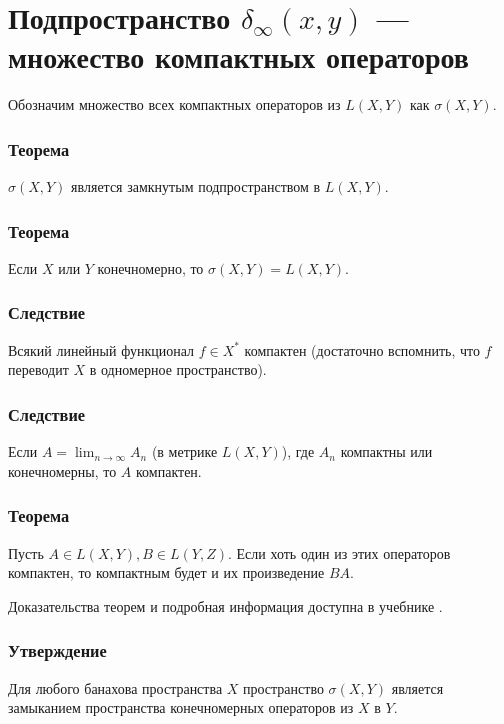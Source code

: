 \section{Подпространство $\delta_\infty (x, y)$ --- множество компактных операторов}
\label{sec:q-39}
Обозначим множество всех компактных операторов из $L(X, Y)$ как $\sigma(X, Y)$.

\subsubsection*{Теорема}
$\sigma(X, Y)$ является замкнутым подпространством в $L(X, Y)$.

\subsubsection*{Теорема}
Если $X$ или $Y$ конечномерно, то $\sigma(X, Y) = L(X, Y)$.

\subsubsection*{Следствие}
Всякий линейный функционал $f \in X^*$ компактен (достаточно вспомнить, что $f$ переводит $X$ в одномерное пространство).

\subsubsection*{Следствие}
Если $\displaystyle A = \lim_{n \rightarrow \infty} A_n$ (в метрике $L(X, Y)$), где  $A_n$ компактны или конечномерны, то $A$ компактен.

\subsubsection*{Теорема}
Пусть $A \in L(X, Y), B \in L(Y, Z)$. Если хоть один из этих операторов компактен, то компактным будет и их произведение $BA$.

Доказательства теорем и подробная информация доступна в учебнике \cite[с.~204]{trenogin}.

\subsubsection*{Утверждение}
Для любого банахова пространства $X$ пространство $\sigma(X,Y)$ является замыканием пространства конечномерных операторов из $X$ в $Y$.